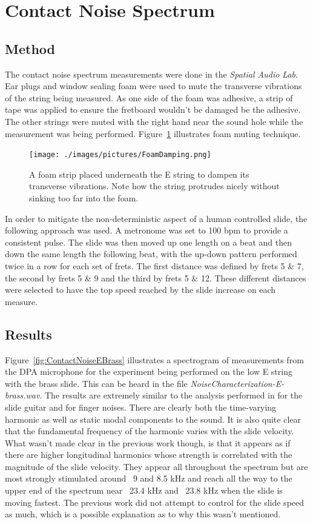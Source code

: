 \documentclass[../main.tex]{subfiles}
\begin{document}
\section{Contact Noise Spectrum}
\subsection{Method}
The contact noise spectrum measurements were done in the \emph{Spatial Audio Lab}. Ear plugs and window sealing foam were used to mute the transverse vibrations of the string being measured. As one side of the foam was adhesive, a strip of tape was applied to ensure the fretboard wouldn't be damaged be the adhesive. The other strings were muted with the right hand near the sound hole while the measurement was being performed. Figure~\ref{fig:FoamStrip} illustrates foam muting technique.

\begin{figure}[h]
    \centering
    \texttt{[image: ./images/pictures/FoamDamping.png]}
    \caption{A foam strip placed underneath the E string to dampen its transverse vibrations. Note how the string protrudes nicely without sinking too far into the foam.}
    \label{fig:FoamStrip}
\end{figure}

In order to mitigate the non-deterministic aspect of a human controlled slide, the following approach was used. A metronome was set to 100 bpm to provide a consistent pulse. The slide was then moved up one length on a beat and then down the same length the following beat, with the up-down pattern performed twice in a row for each set of frets. The first distance was defined by frets 5 \& 7, the second by frets 5 \& 9 and the third by frets 5 \& 12. These different distances were selected to have the top speed reached by the slide increase on each measure.

\subsection{Results}
Figure~\ref{fig:ContactNoiseEBrass} illustrates a spectrogram of  measurements from the DPA microphone for the experiment being performed on the low E string with the brass slide. This can be heard in the file \emph{NoiseCharacterization-E-brass.wav}. The results are extremely similar to the analysis performed in  for the slide guitar and  for finger noises. There are clearly both the time-varying harmonic as well as static modal components to the sound. It is also quite clear that the fundamental frequency of the harmonic varies with the slide velocity. What wasn't made clear in the previous work though, is that it appears as if there are higher longitudinal harmonics whose strength is correlated with the magnitude of the slide velocity. They appear all throughout the spectrum but are most strongly stimulated around ~9 and 8.5 kHz and reach all the way to the upper end of the spectrum near ~23.4 kHz and ~23.8 kHz when the slide is moving fastest. The previous work did not attempt to control for the slide speed as much, which is a possible explanation as to why this wasn't mentioned.
\end{document}
